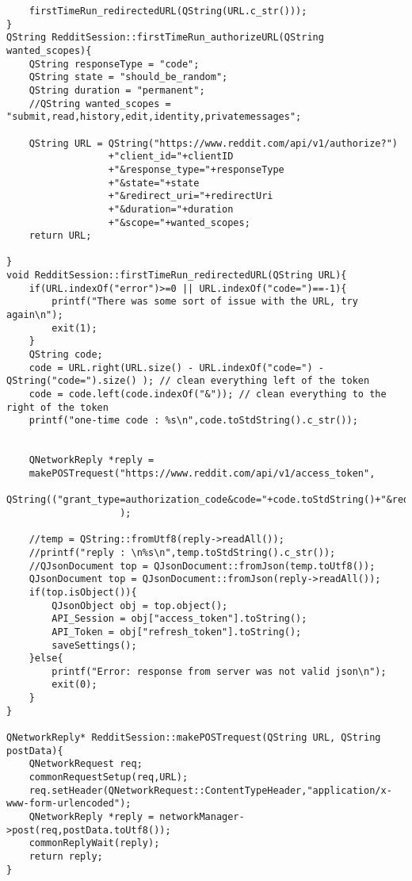 \documentclass[12pt]{article}
\begin{document}
\begin{verbatim}
	firstTimeRun_redirectedURL(QString(URL.c_str()));
}
QString RedditSession::firstTimeRun_authorizeURL(QString wanted_scopes){
	QString responseType = "code";
	QString state = "should_be_random";
	QString duration = "permanent";
	//QString wanted_scopes = "submit,read,history,edit,identity,privatemessages";

	QString URL = QString("https://www.reddit.com/api/v1/authorize?")
				  +"client_id="+clientID
				  +"&response_type="+responseType
				  +"&state="+state
				  +"&redirect_uri="+redirectUri
				  +"&duration="+duration
				  +"&scope="+wanted_scopes;
	return URL;

}
void RedditSession::firstTimeRun_redirectedURL(QString URL){
	if(URL.indexOf("error")>=0 || URL.indexOf("code=")==-1){
		printf("There was some sort of issue with the URL, try again\n");
		exit(1);
	}
	QString code;
	code = URL.right(URL.size() - URL.indexOf("code=") - QString("code=").size() ); // clean everything left of the token
	code = code.left(code.indexOf("&")); // clean everything to the right of the token
	printf("one-time code : %s\n",code.toStdString().c_str());


	QNetworkReply *reply =
	makePOSTrequest("https://www.reddit.com/api/v1/access_token",
					QString(("grant_type=authorization_code&code="+code.toStdString()+"&redirect_uri="+redirectUri.toStdString()).c_str())
					);

	//temp = QString::fromUtf8(reply->readAll());
	//printf("reply : \n%s\n",temp.toStdString().c_str());
	//QJsonDocument top = QJsonDocument::fromJson(temp.toUtf8());
	QJsonDocument top = QJsonDocument::fromJson(reply->readAll());
	if(top.isObject()){
		QJsonObject obj = top.object();
		API_Session = obj["access_token"].toString();
		API_Token = obj["refresh_token"].toString();
		saveSettings();
	}else{
		printf("Error: response from server was not valid json\n");
		exit(0);
	}
}

QNetworkReply* RedditSession::makePOSTrequest(QString URL, QString postData){
	QNetworkRequest req;
	commonRequestSetup(req,URL);
	req.setHeader(QNetworkRequest::ContentTypeHeader,"application/x-www-form-urlencoded");
	QNetworkReply *reply = networkManager->post(req,postData.toUtf8());
	commonReplyWait(reply);
	return reply;
}


\end{verbatim}
\end{document}
